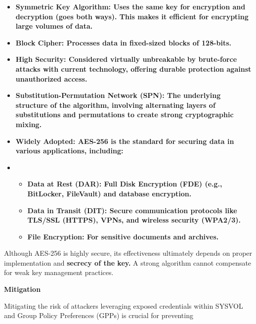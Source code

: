 \begin{itemize}
    \item \textbf{\textbf{Symmetric Key Algorithm: }Uses the same key for encryption and decryption (goes both ways). This makes it efficient for encrypting large volumes of data.}
    \item \textbf{\textbf{Block Cipher: }Processes data in fixed-sized blocks of 128-bits.}
    \item \textbf{\textbf{High Security: }Considered virtually unbreakable by brute-force attacks with current technology, offering durable protection against unauthorized access.}
    \item \textbf{\textbf{Substitution-Permutation Network (SPN): }The underlying structure of the algorithm, involving alternating layers of substitutions and permutations to create strong cryptographic mixing.}
    \item \textbf{\textbf{Widely Adopted: }AES-256 is the standard for securing data in various applications, including:}
\end{itemize}
\begin{itemize}
    \item\begin{itemize}
        \item \textbf{\textbf{Data at Rest (DAR): }Full Disk Encryption (FDE) (e.g., BitLocker, FileVault) and database encryption.}
    \end{itemize}
    \begin{itemize}
        \item \textbf{\textbf{Data in Transit (DIT): }Secure communication protocols like TLS/SSL (HTTPS), VPNs, and wireless security (WPA2/3).}
    \end{itemize}
    \begin{itemize}
        \item \textbf{\textbf{File Encryption: }For sensitive documents and archives.}
    \end{itemize}
\end{itemize}

Although AES-256 is highly secure, its effectiveness ultimately depends on proper implementation and \textbf{ secrecy of the key. }A strong algorithm cannot compensate for weak key management practices.

\textbf{Mitigation}

Mitigating the risk of attackers leveraging exposed credentials within SYSVOL and Group Policy Preferences (GPPs) is crucial for preventing

